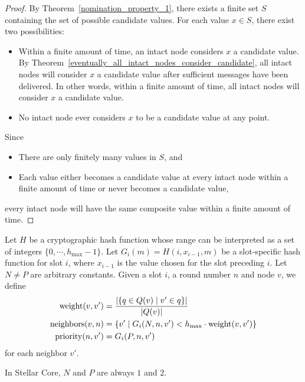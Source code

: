\begin{proof}
    By Theorem~\ref{nomination_property_1}, there exists a finite set $S$ containing the set of possible candidate values.
    For each value $x \in S$, there exist two possibilities:
    \begin{itemize}
        \item
            Within a finite amount of time, an intact node considers $x$ a candidate value.
            By Theorem~\ref{eventually_all_intact_nodes_consider_candidate}, all intact nodes will consider $x$ a candidate value after sufficient messages have been delivered.
            In other words, within a finite amount of time, all intact nodes will consider $x$ a candidate value.
        \item
            No intact node ever considers $x$ to be a candidate value at any point.
    \end{itemize}
    Since
    \begin{itemize}
        \item
            There are only finitely many values in $S$, and
        \item
            Each value either becomes a candidate value at every intact node within a finite amount of time or never becomes a candidate value,
    \end{itemize}
    every intact node will have the same composite value within a finite amount of time.
\end{proof}


\begin{defn}
    Let $H$ be a cryptographic hash function whose range can be interpreted as a set of integers $\{ 0, \cdots, h_{\max} - 1 \}$.
    Let $G_i(m) = H(i, x_{i - 1}, m)$ be a slot-specific hash function for slot $i$, where $x_{i - 1}$ is the value chosen for the slot preceding $i$.
    Let $N \ne P$ are arbitrary constants.
    Given a slot $i$, a round number $n$ and node $v$, we define
    \begin{align*}
        \operatorname{weight}(v, v') &= \frac{\abs{\{ q \in Q(v) \mid v' \in q \}}}{\abs{Q(v)}} \\
        \operatorname{neighbors}(v, n) &= \{ v' \mid G_i(N, n, v') < h_{\max} \cdot \operatorname{weight}(v, v') \} \\
        \operatorname{priority}(n, v') &= G_i(P, n, v')
    \end{align*}
    for each neighbor $v'$.
\end{defn}

\begin{rem}
    In Stellar Core, $N$ and $P$ are always $1$ and $2$.
\end{rem}

